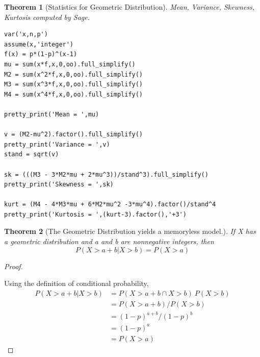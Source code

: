 \documentclass[10pt,]{book}
\theoremstyle{plain}
\newtheorem{theorem}{Theorem}[section]
\theoremstyle{definition}
\theoremstyle{definition}
\theoremstyle{definition}
\numberwithin{equation}{section}
\begin{document}
\begin{theorem}[{Statistics for Geometric Distribution}]\label{theorem-40}
Mean, Variance, Skewness, Kurtosis computed by Sage.
		
\begin{lstlisting}[style=sageinput]
var('x,n,p')
assume(x,'integer')
f(x) = p*(1-p)^(x-1)
mu = sum(x*f,x,0,oo).full_simplify()
M2 = sum(x^2*f,x,0,oo).full_simplify()
M3 = sum(x^3*f,x,0,oo).full_simplify()
M4 = sum(x^4*f,x,0,oo).full_simplify()

pretty_print('Mean = ',mu)

v = (M2-mu^2).factor().full_simplify()
pretty_print('Variance = ',v)
stand = sqrt(v)

sk = (((M3 - 3*M2*mu + 2*mu^3))/stand^3).full_simplify()
pretty_print('Skewness = ',sk)

kurt = (M4 - 4*M3*mu + 6*M2*mu^2 -3*mu^4).factor()/stand^4
pretty_print('Kurtosis = ',(kurt-3).factor(),'+3')
\end{lstlisting}
\end{theorem}
\begin{theorem}[{The Geometric Distribution yields a memoryless model.}]\label{theorem-41}
If X has a geometric distribution and a and b are nonnegative integers, then
	\begin{equation*}P( X > a + b | X > b ) = P( X > a)\end{equation*}
\end{theorem}
\begin{proof}\hypertarget{proof-41}{}
Using the definition of conditional probability,
	\begin{align*}
P( X > a + b | X > b ) & = P( X > a + b \cap X > b ) \ P( X > b)\\
 & = P( X > a + b ) / P( X > b)\\
 & = (1-p)^{a+b} / (1-p)^b\\
 & = (1-p)^a\\
 & = P(X > a)
\end{align*}
\end{proof}
\typeout{************************************************}
\typeout{************************************************}
\end{document}
